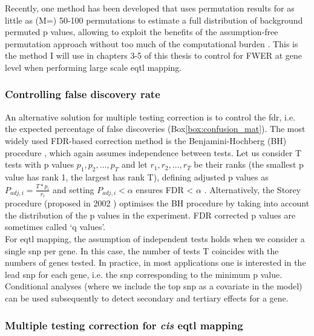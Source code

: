 Recently, one method has been developed that uses permutation results for as little as (M=) 50-100 permutations to estimate a full distribution of background permuted p values, allowing to exploit the benefits of the assumption-free permutation approach without too much of the computational burden \cite{ongen2016fast}. 
This is the method I will use in chapters 3-5 of this thesis to control for FWER at gene level when performing large scale \gls{eqtl} mapping.

\subsubsection{Controlling false discovery rate}

An alternative solution for multiple testing correction is to control the \gls{fdr}, i.e. the expected percentage of false discoveries (Box\ref{box:confusion_mat}).
The most widely used FDR-based correction method is the Benjamini-Hochberg (BH) procedure \cite{benjamini1995controlling}, which again assumes independence between tests. 
Let us consider T tests with p values $p_1, p_2, ..., p_T$ and let $r_1, r_2, ..., r_T$ be their ranks (the smallest p value has rank 1, the largest has rank T), defining adjusted p values as $P_{adj,i} = \frac{T*p_i}{r_i} $ and setting $P_{adj,i} <\alpha$ ensures FDR < $\alpha$ \cite{yekutieli1999resampling}.
Alternatively, the Storey procedure (proposed in 2002 \cite{storey2002direct}) optimises the BH procedure by taking into account the distribution of the p values in the experiment.
FDR corrected p values 
are sometimes called `q values'.\\


For \gls{eqtl} mapping, the assumption of independent tests holds when we consider a single \gls{snp} per gene.
In this case, the number of tests T coincides with the numbers of genes tested.
In practice, in most applications one is interested in the lead \gls{snp} for each gene, i.e. the \gls{snp} corresponding to the minimum p value.
Conditional analyses (where we include the top \gls{snp} as a covariate in the model) can be used subsequently to detect secondary and tertiary effects for a gene.

\subsubsection{Multiple testing correction for \textit{cis} e\gls{qtl} mapping}

